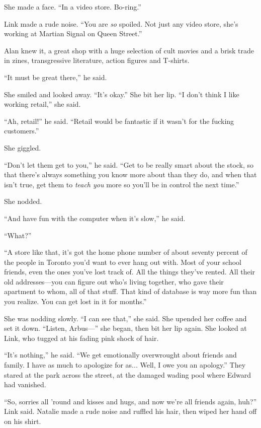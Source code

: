 \documentclass{article}
\begin{document}
She made a face.  ``In a video store.  Bo-ring.''

Link made a rude noise.  ``You are \textit{so} spoiled.  Not just any
video store, she's working at Martian Signal on Queen Street.''

Alan knew it, a great shop with a huge selection of cult movies and a
brisk trade in zines, transgressive literature, action figures and
T-shirts.

``It must be great there,'' he said.

She smiled and looked away.  ``It's okay.'' She bit her lip.  ``I
don't think I like working retail,'' she said.

``Ah, retail!'' he said.  ``Retail would be fantastic if it wasn't for
the fucking customers.''

She giggled.

``Don't let them get to you,'' he said.  ``Get to be really smart
about the stock, so that there's always something you know more about
than they do, and when that isn't true, get them to \textit{teach you}
more so you'll be in control the next time.''

She nodded.

``And have fun with the computer when it's slow,'' he said.

``What?''

``A store like that, it's got the home phone number of about seventy
percent of the people in Toronto you'd want to ever hang out with. 
Most of your school friends, even the ones you've lost track of.  All
the things they've rented.  All their old addresses---you can figure
out who's living together, who gave their apartment to whom, all of
that stuff.  That kind of database is way more fun than you realize. 
You can get lost in it for months.''

She was nodding slowly.  ``I can see that,'' she said.  She upended
her coffee and set it down.  ``Listen, Arbus---'' she began, then bit
her lip again.  She looked at Link, who tugged at his fading pink
shock of hair.

``It's nothing,'' he said.  ``We get emotionally overwrought about
friends and family.  I have as much to apologize for as...  Well, I
owe you an apology.'' They stared at the park across the street, at
the damaged wading pool where Edward had vanished.

``So, sorries all 'round and kisses and hugs, and now we're all
friends again, huh?'' Link said.  Natalie made a rude noise and
ruffled his hair, then wiped her hand off on his shirt.
\end{document}
